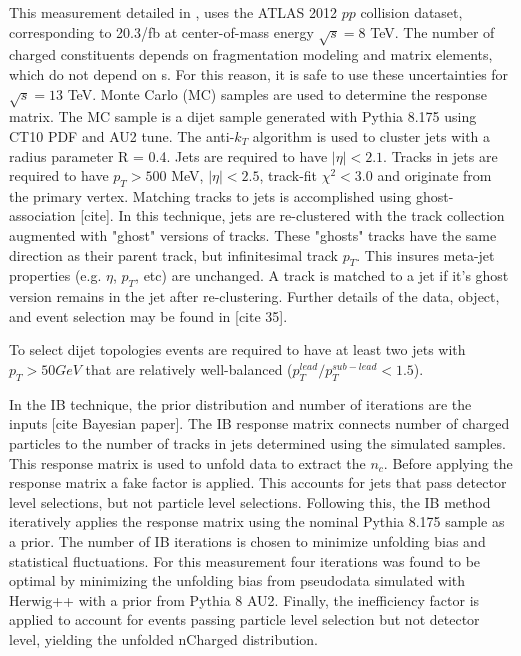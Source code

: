 This measurement detailed in \cite{Unfolding}, uses the ATLAS 2012 $pp$ collision dataset, corresponding to 20.3/fb at center-of-mass energy $\sqrt{s}=8$ TeV. The number of charged constituents depends on fragmentation modeling and matrix elements, which do not depend on s. For this reason, it is safe to use these uncertainties for $\sqrt{s}=13$ TeV. Monte Carlo (MC) samples are used to determine the response matrix. The MC sample is a dijet sample generated with Pythia 8.175 using CT10 PDF and AU2 tune.  The anti-$k_{T}$ algorithm is used to cluster jets with a radius parameter R = 0.4. Jets are required to have $|\eta| < 2.1$. Tracks in jets are required to have $p_{T}>500$ MeV, $|\eta|<2.5$, track-fit $\chi^{2} < 3.0$ and originate from the primary vertex. Matching tracks to jets is accomplished using ghost-association [cite]. In this technique, jets are re-clustered with the track collection augmented with "ghost" versions of tracks.  These "ghosts" tracks have the same direction as their parent track, but infinitesimal track $p_{T}$. This insures meta-jet properties (e.g. $\eta$, $p_{T}$, etc) are unchanged. A track is matched to a jet if it's ghost version remains in the jet after re-clustering. Further details of the data, object, and event selection may be found in [cite 35].

To select dijet topologies events are required to have at least two jets with $p_{T} > 50GeV$ that are relatively well-balanced ($p_{T}^{lead}/p_{T}^{sub-lead} < 1.5$). 

In the IB technique, the prior distribution and number of iterations are the inputs [cite Bayesian paper]. The IB response matrix connects number of charged particles to the number of tracks in jets determined using the simulated samples. This response matrix is used to unfold data to extract the $n_{c}$. Before applying the response matrix a fake factor is applied. This accounts for jets that pass detector level selections, but not particle level selections. Following this, the IB method iteratively applies the response matrix using the nominal Pythia 8.175 sample as a prior. The number of IB iterations is chosen to minimize unfolding bias and statistical fluctuations. For this measurement four iterations was found to be optimal by minimizing the unfolding bias from pseudodata simulated with Herwig++ with a prior from Pythia 8 AU2. Finally, the inefficiency factor is applied to account for events passing particle level selection but not detector level, yielding the unfolded nCharged distribution.
 
